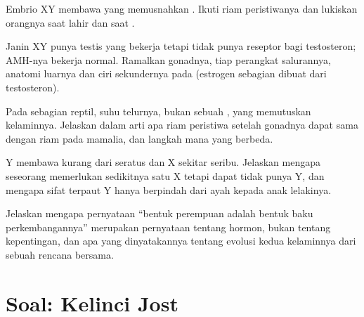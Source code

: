 \begin{exercise}[$\star\star$]\label{exo:g11:becoming-male-female:11}
Embrio XY membawa  yang memusnahkan  . Ikuti riam
peristiwanya dan lukiskan orangnya saat lahir dan saat .
\end{exercise}

\begin{exercise}[$\star\star\star$]\label{exo:g11:becoming-male-female:12}
Janin XY punya testis yang bekerja tetapi  tidak punya reseptor
bagi testosteron; AMH-nya bekerja normal. Ramalkan gonadnya, tiap
perangkat salurannya, anatomi luarnya dan ciri sekundernya pada
 (estrogen sebagian dibuat dari testosteron).
\end{exercise}

\begin{exercise}[$\star\star\star$]\label{exo:g11:becoming-male-female:13}
Pada sebagian reptil, suhu telurnya, bukan sebuah , yang
memutuskan kelaminnya. Jelaskan dalam arti apa riam peristiwa setelah
gonadnya dapat sama dengan riam pada mamalia, dan langkah mana yang berbeda.
\end{exercise}

\begin{exercise}[$\star\star\star$]\label{exo:g11:becoming-male-female:14}
 Y membawa kurang dari seratus  dan  X sekitar
seribu. Jelaskan mengapa seseorang memerlukan sedikitnya satu X tetapi
dapat tidak punya Y, dan mengapa sifat terpaut Y hanya berpindah dari
ayah kepada anak lelakinya.
\end{exercise}

\begin{exercise}[$\star\star\star$]\label{exo:g11:becoming-male-female:15}
Jelaskan mengapa pernyataan ``bentuk perempuan adalah bentuk baku
perkembangannya'' merupakan pernyataan tentang hormon, bukan tentang
kepentingan, dan apa yang dinyatakannya tentang evolusi kedua kelaminnya
dari sebuah rencana bersama.
\end{exercise}

\section{Soal: Kelinci Jost}

